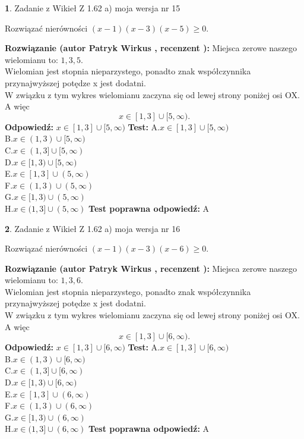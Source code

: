 \documentclass[12pt, a4paper]{article}
\theoremstyle{definition} %
\newtheorem{zad}{}
\newcommand{\zadStart}[1]{\begin{zad}#1\newline}
\newcommand{\zadStop}{\end{zad}}
\newcommand{\rozwStart}[2]{\noindent \textbf{Rozwiązanie (autor #1 , recenzent #2): }\newline}
\newcommand{\rozwStop}{\newline}
\newcommand{\odpStart}{\noindent \textbf{Odpowiedź:}\newline}
\newcommand{\odpStop}{\newline}
\newcommand{\testStart}{\noindent \textbf{Test:}\newline}
\newcommand{\testStop}{\newline}
\newcommand{\kluczStart}{\noindent \textbf{Test poprawna odpowiedź:}\newline}
\newcommand{\kluczStop}{\newline}
\begin{document}
\zadStart{Zadanie z Wikieł Z 1.62 a) moja wersja nr 15}

Rozwiązać nierówności $(x-1)(x-3)(x-5)\ge0$.
\zadStop
\rozwStart{Patryk Wirkus}{}
Miejsca zerowe naszego wielomianu to: $1, 3, 5$.\\
Wielomian jest stopnia nieparzystego, ponadto znak współczynnika przy\linebreak najwyższej potędze x jest dodatni.\\ W związku z tym wykres wielomianu zaczyna się od lewej strony poniżej osi OX. A więc $$x \in [1,3] \cup [5,\infty).$$
\rozwStop
\odpStart
$x \in [1,3] \cup [5,\infty)$
\odpStop
\testStart
A.$x \in [1,3] \cup [5,\infty)$\\
B.$x \in (1,3) \cup [5,\infty)$\\
C.$x \in (1,3] \cup [5,\infty)$\\
D.$x \in [1,3) \cup [5,\infty)$\\
E.$x \in [1,3] \cup (5,\infty)$\\
F.$x \in (1,3) \cup (5,\infty)$\\
G.$x \in [1,3) \cup (5,\infty)$\\
H.$x \in (1,3] \cup (5,\infty)$
\testStop
\kluczStart
A
\kluczStop



\zadStart{Zadanie z Wikieł Z 1.62 a) moja wersja nr 16}

Rozwiązać nierówności $(x-1)(x-3)(x-6)\ge0$.
\zadStop
\rozwStart{Patryk Wirkus}{}
Miejsca zerowe naszego wielomianu to: $1, 3, 6$.\\
Wielomian jest stopnia nieparzystego, ponadto znak współczynnika przy\linebreak najwyższej potędze x jest dodatni.\\ W związku z tym wykres wielomianu zaczyna się od lewej strony poniżej osi OX. A więc $$x \in [1,3] \cup [6,\infty).$$
\rozwStop
\odpStart
$x \in [1,3] \cup [6,\infty)$
\odpStop
\testStart
A.$x \in [1,3] \cup [6,\infty)$\\
B.$x \in (1,3) \cup [6,\infty)$\\
C.$x \in (1,3] \cup [6,\infty)$\\
D.$x \in [1,3) \cup [6,\infty)$\\
E.$x \in [1,3] \cup (6,\infty)$\\
F.$x \in (1,3) \cup (6,\infty)$\\
G.$x \in [1,3) \cup (6,\infty)$\\
H.$x \in (1,3] \cup (6,\infty)$
\testStop
\kluczStart
A
\kluczStop
\end{document}
